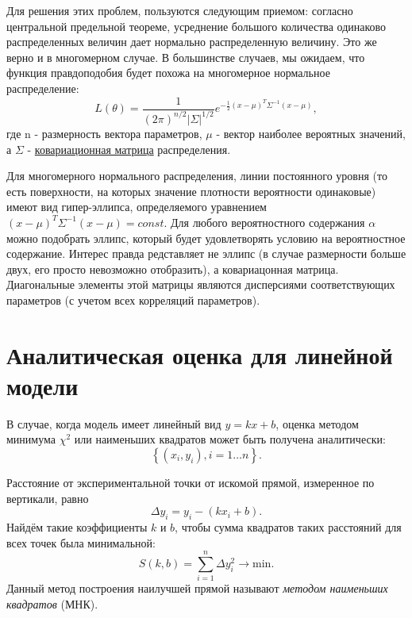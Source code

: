 Для решения этих проблем, пользуются следующим приемом: согласно
центральной предельной теореме, усреднение большого количества одинаково
распределенных величин дает нормально распределенную величину. Это же
верно и в многомерном случае. В большинстве случаев, мы ожидаем, что
функция правдоподобия будет похожа на многомерное нормальное
распределение: 
\begin{equation}
    L(\theta) = \frac{1}{(2 \pi)^{n/2}\left|\Sigma\right|^{1/2}} e^{-\frac{1}{2} (x - \mu)^T \Sigma^{-1} (x - \mu)},
\end{equation} 
где n - размерность вектора параметров, $\mu$ - вектор
наиболее вероятных значений, а $\Sigma$ -
\href{https://ru.wikipedia.org/wiki/\%D0\%9A\%D0\%BE\%D0\%B2\%D0\%B0\%D1\%80\%D0\%B8\%D0\%B0\%D1\%86\%D0\%B8\%D0\%BE\%D0\%BD\%D0\%BD\%D0\%B0\%D1\%8F_\%D0\%BC\%D0\%B0\%D1\%82\%D1\%80\%D0\%B8\%D1\%86\%D0\%B0}{ковариационная
матрица} распределения.

Для многомерного нормального распределения, линии постоянного уровня (то
есть поверхности, на которых значение плотности вероятности одинаковые)
имеют вид гипер-эллипса, определяемого уравнением
$(x - \mu)^T \Sigma^{-1} (x - \mu) = const$. Для любого вероятностного
содержания $\alpha$ можно подобрать эллипс, который будет
удовлетворять условию на вероятностное содержание. Интерес правда
редставляет не эллипс (в случае размерности больше двух, его просто
невозможно отобразить), а ковариацонная матрица. Диагональные элементы
этой матрицы являются дисперсиями соответствующих параметров (с учетом
всех корреляций параметров).

    
\section{Аналитическая оценка для линейной модели}
\label{sec:linear}

В случае, когда модель имеет линейный вид $y=kx+b$, оценка методом минимума $\chi^2$ или наименьших квадратов может быть получена аналитически:
\[
\left\{ \left(x_{i},y_{i}\right),i=1\ldots n\right\} .
\]

Расстояние от экспериментальной точки от искомой прямой, измеренное
по вертикали, равно
\[
\Delta y_{i}=y_{i}-\left(kx_{i}+b\right).
\]
Найдём такие коэффициенты $k$ и $b$, чтобы сумма квадратов таких
расстояний для всех точек была минимальной:
\begin{equation}
S\!\left(k,b\right)=\sum\limits _{i=1}^{n}\Delta y_{i}^{2}\to\mathrm{min}.\label{eq:mnk_S}
\end{equation}
Данный метод построения наилучшей прямой называют \emph{методом наименьших
квадратов} (МНК).

